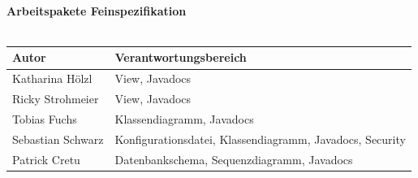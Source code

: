 \documentclass[a4paper, 12pt]{scrreprt}
\begin{document}
\begin{titlepage}
\begin{center}
        \ \\
        \ \\
        \hspace{3 cm}\\
         \textbf{Arbeitspakete Feinspezifikation} \\
         \ \\
         
         \begin{tabular}{ | l | l |}
         	\hline
         	\textbf{Autor} & \textbf{Verantwortungsbereich} \\ \hline
         	Katharina Hölzl & View, Javadocs \\ \hline
         	Ricky Strohmeier& View, Javadocs \\ \hline
         	Tobias Fuchs & Klassendiagramm, Javadocs \\ \hline
         	Sebastian Schwarz & Konfigurationsdatei, Klassendiagramm, Javadocs, Security \\ \hline  
         	Patrick Cretu  &  Datenbankschema, Sequenzdiagramm, Javadocs  \\ \hline
         \end{tabular}
        
        
    \end{center}
\end{titlepage}



\tableofcontents










\end{document}
